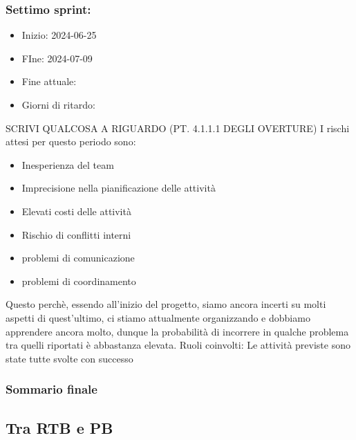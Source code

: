     \subsubsection{Settimo sprint:}
    \begin{itemize}
        \item Inizio: 2024-06-25
        \item FIne: 2024-07-09
        \item Fine attuale:
        \item Giorni di ritardo:
    \end{itemize}
    SCRIVI QUALCOSA A RIGUARDO (PT. 4.1.1.1 DEGLI OVERTURE)
    I rischi attesi per questo periodo sono:
    \begin{itemize}
        \item Inesperienza del team
        \item Imprecisione nella pianificazione delle attività
        \item Elevati costi delle attività
        \item Rischio di conflitti interni 
        \item problemi di comunicazione
        \item problemi di coordinamento
    \end{itemize}
    Questo perchè, essendo all’inizio del progetto, siamo ancora incerti su molti aspetti di quest’ultimo, ci stiamo attualmente organizzando e dobbiamo apprendere ancora molto, dunque la probabilità di incorrere in qualche problema tra quelli riportati è abbastanza elevata.
    Ruoli coinvolti: 
    Le attività previste sono state tutte svolte con successo

    \subsubsection{Sommario finale}

    \subsection{Tra RTB e PB}
